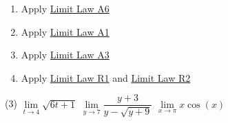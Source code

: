 \documentclass[10pt,oneside,]{book}
\theoremstyle{plain}
\theoremstyle{definition}
\numberwithin{equation}{section}
\begin{document}
\begin{multicols}{2}
\begin{enumerate}[label=(\alph*)]
\item{}Apply \hyperref[lla6]{Limit Law A6}%
\item{}Apply \hyperref[lla1]{Limit Law A1}%
\item{}Apply \hyperref[lla3]{Limit Law A3}%
\item{}Apply \hyperref[llr1]{Limit Law R1} and \hyperref[llr2]{Limit Law R2}%
\end{enumerate}
\end{multicols}
\par
\begin{exercisegroup}(3)
\exercise[4.]\hypertarget{exercise-first-apply-limit-laws}{\null}\(\lim\limits_{t\to4}\sqrt{6t+1}\)%
\exercise[5.]\hypertarget{exercise-70}{\null}\(\lim\limits_{y\to7}\dfrac{y+3}{y-\sqrt{y+9}}\)%
\exercise[6.]\hypertarget{exercise-71}{\null}\(\lim\limits_{x\to\pi}x\cos(x)\)%
\end{exercisegroup}
\par\smallskip\noindent
\typeout{************************************************}
\typeout{************************************************}
\end{document}
